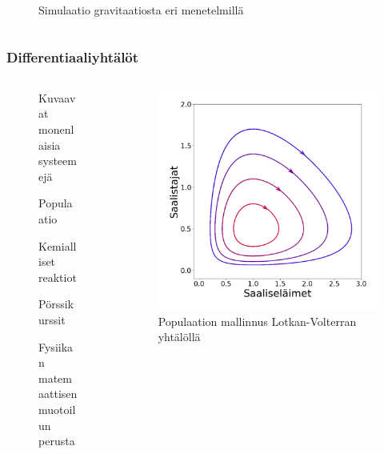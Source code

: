 \documentclass[finnish, 11pt, fleqn]{beamer}
\newcommand{\subitem}[1]{
    {\setlength\itemindent{15pt} \item[-] #1}
}
\begin{document}
\begin{frame}
\begin{columns}[onlytextwidth]
\begin{column}{.45\textwidth}
\begin{figure}
				{\small \caption{Simulaatio gravitaatiosta eri menetelmillä}}
			\end{figure}
		\end{column}
	\end{columns}
    
\end{frame}

\begin{frame}
    \frametitle{Differentiaaliyhtälöt}
    \begin{columns}[onlytextwidth]
		\begin{column}{.45\textwidth}
			\begin{figure}
				\vspace{-4em}
    			\begin{itemize}
    				\item{Kuvaavat monenlaisia systeemejä}
    					\subitem{Populaatio}
    					\subitem{Kemialliset reaktiot}
    					\subitem{Pörssikurssit}
    				\item{Fysiikan matemaattisen muotoilun perusta}
    			\end{itemize}
			\end{figure}
		\end{column}
		\hfill
		\begin{column}{.55\textwidth}
			\begin{figure}[h!]
				\includegraphics[scale=0.25]{graphics/lotka_volterra.png}
				{\caption{Populaation mallinnus Lotkan-Volterran yhtälöllä}}
			\end{figure}
		\end{column}
	\end{columns}	
\end{frame}
\end{document}
